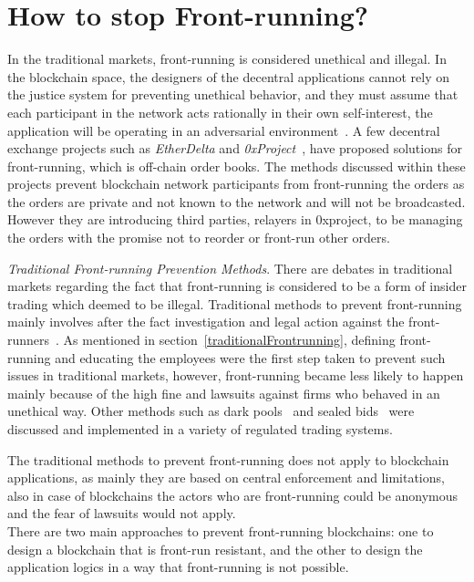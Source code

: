 \section{How to stop Front-running?} %

In the traditional markets, front-running is considered unethical and illegal. In the blockchain space, the designers of the decentral applications cannot rely on the justice system for preventing unethical behavior, and they must assume that each participant in the network acts rationally in their own self-interest, the application will be operating in an adversarial environment~\cite{0xfrontrunning:online}.
A few decentral exchange projects such as \textit{EtherDelta} and \textit{0xProject}~\cite{warren20170x}, have proposed solutions for front-running, which is off-chain order books. The methods discussed within these projects prevent blockchain network participants from front-running the orders as the orders are private and not known to the network and will not be broadcasted. However they are introducing third parties, \eg relayers in 0xproject, to be managing the orders with the promise not to reorder or front-run other orders. 

\emph{Traditional Front-running Prevention Methods}. There are debates in traditional markets regarding the fact that front-running is considered to be a form of insider trading which deemed to be illegal. Traditional methods to prevent front-running mainly involves after the fact investigation and legal action against the front-runners~\cite{LexisNexisLawSuit}. As mentioned in section~\ref{traditionalFrontrunning}, defining front-running and educating the employees were the first step taken to prevent such issues in traditional markets, however, front-running became less likely to happen mainly because of the high fine and lawsuits against firms who behaved in an unethical way. Other methods such as dark pools~\cite{zhu2014dark, buti2011diving} and sealed bids~\cite{radner1989sealed} were discussed and implemented in a variety of regulated trading systems. 

The traditional methods to prevent front-running does not apply to blockchain applications, as mainly they are based on central enforcement and limitations, also in case of blockchains the actors who are front-running could be anonymous and the fear of lawsuits would not apply. \\

There are two main approaches to prevent front-running blockchains: one to design a blockchain that is front-run resistant, and the other to design the application logics in a way that front-running is not possible. 
